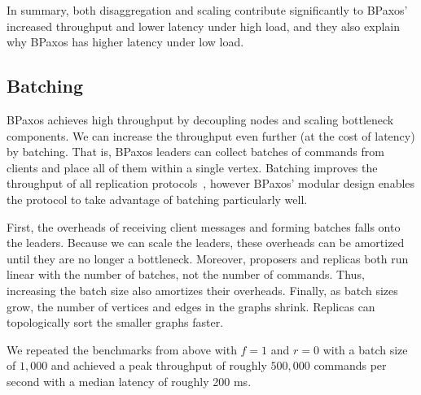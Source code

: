 In summary, both disaggregation and scaling contribute significantly to BPaxos'
increased throughput and lower latency under high load, and they also explain
why BPaxos has higher latency under low load.

%
%
\subsection{Batching}
BPaxos achieves high throughput by decoupling nodes and scaling bottleneck
components. We can increase the throughput even further (at the cost of
latency) by batching. That is, BPaxos leaders can collect batches of commands
from clients and place all of them within a single vertex. Batching improves
the throughput of all replication protocols~\cite{santos2012tuning,
santos2013optimizing, moraru2013proof}, however BPaxos' modular design enables
the protocol to take advantage of batching particularly well.

First, the overheads of receiving client messages and forming batches falls
onto the leaders. Because we can scale the leaders, these overheads can be
amortized until they are no longer a bottleneck. Moreover, proposers and
replicas both run linear with the number of batches, not the number of
commands. Thus, increasing the batch size also amortizes their overheads.
Finally, as batch sizes grow, the number of vertices and edges in the graphs
shrink. Replicas can topologically sort the smaller graphs faster.

We repeated the benchmarks from above with $f=1$ and $r=0$ with a batch size of
$1,000$ and achieved a peak throughput of roughly $500,000$ commands per second
with a median latency of roughly 200 ms.

